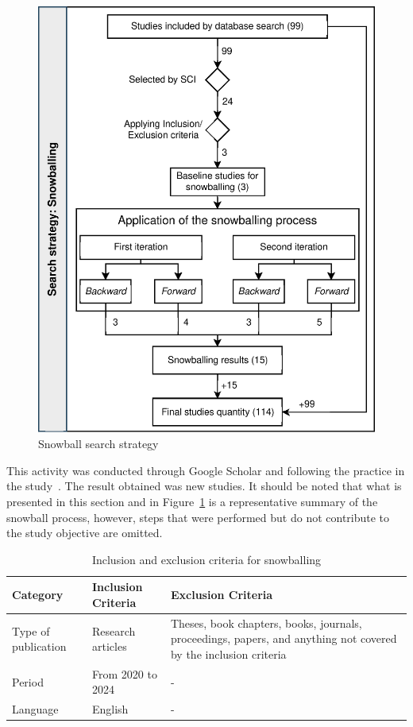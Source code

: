 \begin{figure}[ht]
	\centering
	\includegraphics[scale=0.7]{resources/figures/sms-Snowball.eps}
	\caption{Snowball search strategy}
	\label{figure:Snowball}
\end{figure}

This activity was conducted through Google Scholar and following the practice in the study~\cite{Ali-01}. The result obtained was \snowballNewStudies{} new studies. It should be noted that what is presented in this section and in Figure~\ref{figure:Snowball} is a representative summary of the snowball process, however, steps that were performed but do not contribute to the study objective are omitted.

\begin{table}[ht]
    \renewcommand{\arraystretch}{1.3}
    \centering
    \caption{Inclusion and exclusion criteria for snowballing}
	\begin{tabular}{p{2.7cm}p{3.5cm}p{9.5cm}}
        \hline
		\textbf{Category} & \textbf{Inclusion Criteria} & \textbf{Exclusion Criteria} \\
		\hline
		Type of publication & Research articles & Theses, book chapters, books, journals, proceedings, papers, and anything not covered by the inclusion criteria \\
		Period & From 2020 to 2024  & - \\
		Language & English & - \\
		\hline
	\end{tabular}
	\label{table:inclusion_exclusion_criteria}
\end{table}
